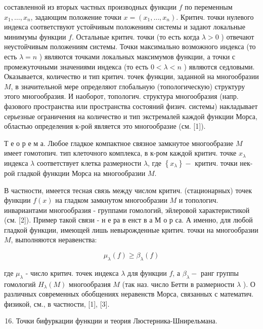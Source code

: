 \documentclass[10pt]{article}
\begin{document}
составленной из вторых частных производных функции $f$ по переменным $x_{1}, \ldots, x_{n}$, задающим положение точки $x=\left(x_{1}, \ldots, x_{n}\right)$. Критич. точки нулевого индекса соответствуют устойчивым положениям системы и задают локальные минимумы функции $f$. Остальные критич. точки (то есть когда $\lambda>0$ ) отвечают неустойчивым положениям системы. Точки максимально возможного индекса (то есть $\lambda=n$ ) являются точками локальных максимумов функции, а точки с промежуточными значениями индекса (то есть $0<\lambda<n$ ) являются седловыми. Оказывается, количество и тип критич. точек функции, заданной на многообразии $M$, в значительной мере определяют глобальную (топологическую) структуру этого многообразия. И наоборот, топологич. структура многообразия (напр. фазового пространства или пространства состояний физич. системы) накладывает серьезные ограничения на количество и тип экстремалей каждой функции Морса, областью определения к-рой является это многообразие (см. [1]).



Т е о р е м а. Любое гладкое компактное связное замкнутое многообразие $M$ имеет гомотопич. тип клеточного комплекса, в к-ром каждой критич. точке $x_{\lambda}$ индекса $\lambda$ соответствует клетка размерности $\lambda$, где $\left\{x_{\lambda}\right\}-$ критич. точки нек-рой гладкой функции Морса на многообразии $M$.



В частности, имеется тесная связь между числом критич. (стационарных) точек функции $f(x)$ на гладком замкнутом многообразии $M$ и топологич. инвариантами многообразия - группами гомологий, эйлеровой характеристикой (см. [2]). Пример такой связи - н е ра в енст в а М о р са. А именно, для любой гладкой функции, имеющей лишь невырожденные критич. точки на многообразии $M$, выполняются неравенства:



\[

\mu_{\lambda}(f) \geqslant \beta_{\lambda}(f)

\]



где $\mu_{\lambda}$ - число критич. точек индекса $\lambda$ для функции $f$, а $\beta_{\lambda}-$ ранг группы гомологий $H_{\lambda}(M)$ многообразия $M$ (так наз. число Бетти в размерности $\lambda$ ). О различных современных обобщениях неравенств Морса, связанных с математич. физикой, см., в частности, [1], [3].



\begin{enumerate}

  \setcounter{enumi}{15}

  \item Точки бифуркации функции и теория Люстерника-Шнирельмана.

\end{enumerate}
\end{document}

